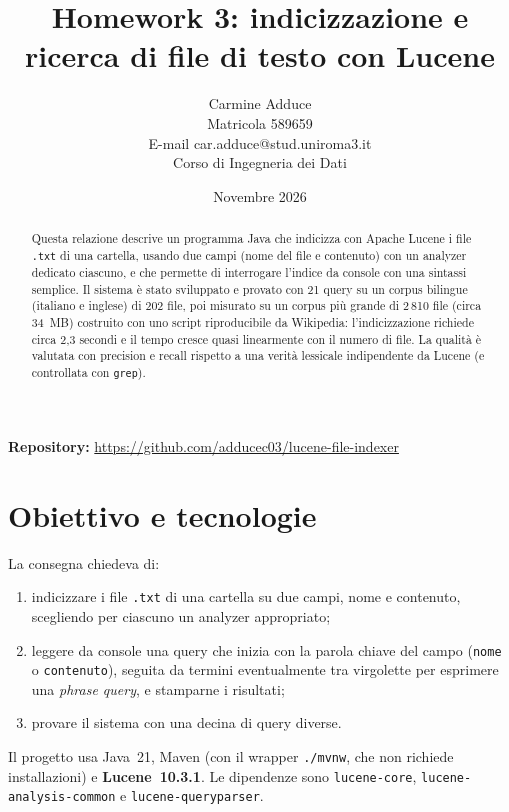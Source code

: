 \documentclass[11pt,a4paper]{article}
\title{Homework 3: indicizzazione e ricerca di file di testo con Lucene}
\author{Carmine Adduce \\ \small Matricola 589659 \\
            \small E-mail car.adduce@stud.uniroma3.it \\
            \small Corso di Ingegneria dei Dati}
\date{Novembre 2026}
\newcommand{\code}[1]{\texttt{#1}}
\newcommand{\field}[1]{\texttt{#1}}
\begin{document}
\maketitle

\begin{abstract}
Questa relazione descrive un programma Java che indicizza con Apache Lucene i file
\code{.txt} di una cartella, usando due campi (nome del file e contenuto) con un
analyzer dedicato ciascuno, e che permette di interrogare l'indice da console con
una sintassi semplice. Il sistema è stato sviluppato e provato con 21 query su un
corpus bilingue (italiano e inglese) di 202 file, poi misurato su un corpus più
grande di 2\,810 file (circa 34~MB) costruito con uno script riproducibile da
Wikipedia: l'indicizzazione richiede circa 2,3 secondi e il tempo cresce quasi
linearmente con il numero di file. La qualità è valutata con precision e recall
rispetto a una verità lessicale indipendente da Lucene (e controllata con
\code{grep}).
\end{abstract}

\noindent\textbf{Repository:}
\url{https://github.com/adducec03/lucene-file-indexer}

\section{Obiettivo e tecnologie}

La consegna chiedeva di:
\begin{enumerate}
  \item indicizzare i file \code{.txt} di una cartella su due campi, nome e
        contenuto, scegliendo per ciascuno un analyzer appropriato;
  \item leggere da console una query che inizia con la parola chiave del campo
        (\field{nome} o \field{contenuto}), seguita da termini eventualmente tra
        virgolette per esprimere una \emph{phrase query}, e stamparne i risultati;
  \item provare il sistema con una decina di query diverse.
\end{enumerate}

\noindent Il progetto usa Java~21, Maven (con il wrapper \code{./mvnw}, che non
richiede installazioni) e \textbf{Lucene~10.3.1}. Le dipendenze sono \code{lucene-core}, \code{lucene-analysis-common} e
\code{lucene-queryparser}.
\end{document}
